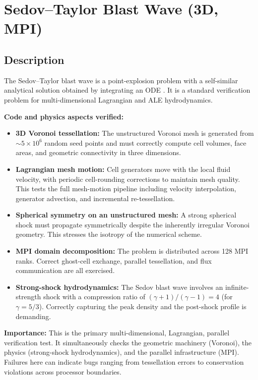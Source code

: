 \documentclass[11pt,a4paper]{article}
\begin{document}
\newpage

\section{Sedov--Taylor Blast Wave (3D, MPI)}
\label{sec:sedov_3d_mpi}

\subsection*{Description}
The Sedov--Taylor blast wave \cite{sedov1959,taylor1950} is a point-explosion problem with a self-similar analytical solution obtained by integrating an ODE \cite{kamm2007}. It is a standard verification problem for multi-dimensional Lagrangian and ALE hydrodynamics.

\textbf{Code and physics aspects verified:}
\begin{itemize}
  \item \textbf{3D Voronoi tessellation:} The unstructured Voronoi mesh is generated from $\sim\!5\times10^6$ random seed points and must correctly compute cell volumes, face areas, and geometric connectivity in three dimensions.
  \item \textbf{Lagrangian mesh motion:} Cell generators move with the local fluid velocity, with periodic cell-rounding corrections to maintain mesh quality. This tests the full mesh-motion pipeline including velocity interpolation, generator advection, and incremental re-tessellation.
  \item \textbf{Spherical symmetry on an unstructured mesh:} A strong spherical shock must propagate symmetrically despite the inherently irregular Voronoi geometry. This stresses the isotropy of the numerical scheme.
  \item \textbf{MPI domain decomposition:} The problem is distributed across 128 MPI ranks. Correct ghost-cell exchange, parallel tessellation, and flux communication are all exercised.
  \item \textbf{Strong-shock hydrodynamics:} The Sedov blast wave involves an infinite-strength shock with a compression ratio of $(\gamma+1)/(\gamma-1) = 4$ (for $\gamma = 5/3$). Correctly capturing the peak density and the post-shock profile is demanding.
\end{itemize}

\textbf{Importance:} This is the primary multi-dimensional, Lagrangian, parallel verification test. It simultaneously checks the geometric machinery (Voronoi), the physics (strong-shock hydrodynamics), and the parallel infrastructure (MPI). Failures here can indicate bugs ranging from tessellation errors to conservation violations across processor boundaries.
\end{document}
